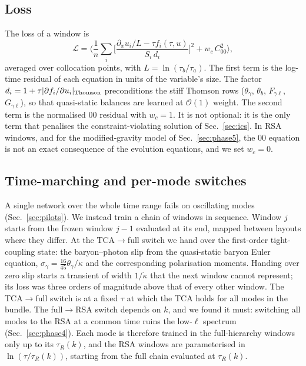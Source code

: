 \documentclass[prd,twocolumn,superscriptaddress,nofootinbib,floatfix]{revtex4-2}
\newcommand{\kd}{\dot\kappa}
\begin{document}
\subsection{Loss}
The loss of a window is
\begin{equation}
\mathcal{L}=\Big\langle \frac{1}{n}\sum_{i}\Big[\frac{\partial_x u_i/L-\tau f_i(\tau,u)}{S_i\,d_i}\Big]^2 + w_c\,C_{00}^2\Big\rangle ,\label{eq:loss}
\end{equation}
averaged over collocation points, with $L=\ln(\tau_b/\tau_a)$. The first term is the log-time residual of each equation in units of the variable's size. The factor $d_i=1+\tau|\partial f_i/\partial u_i|_{\rm Thomson}$ preconditions the stiff Thomson rows ($\theta_\gamma$, $\theta_b$, $F_{\gamma\ell}$, $G_{\gamma\ell}$), so that quasi-static balances are learned at $\mathcal{O}(1)$ weight. The second term is the normalised $00$ residual with $w_c=1$. It is not optional: it is the only term that penalises the constraint-violating solution of Sec.~\ref{sec:ics}. In RSA windows, and for the modified-gravity model of Sec.~\ref{sec:phase5}, the $00$ equation is not an exact consequence of the evolution equations, and we set $w_c=0$.

\subsection{Time-marching and per-mode switches}
A single network over the whole time range fails on oscillating modes (Sec.~\ref{sec:pilots}). We instead train a chain of windows in sequence. Window $j$ starts from the frozen window $j-1$ evaluated at its end, mapped between layouts where they differ. At the TCA$\to$full switch we hand over the first-order tight-coupling state: the baryon--photon slip from the quasi-static baryon Euler equation, $\sigma_\gamma=\frac{16}{45}\theta_\gamma/\kd$ and the corresponding polarisation moments. Handing over zero slip starts a transient of width $1/\kd$ that the next window cannot represent; its loss was three orders of magnitude above that of every other window. The TCA$\to$full switch is at a fixed $\tau$ at which the TCA holds for all modes in the bundle. The full$\to$RSA switch depends on $k$, and we found it must: switching all modes to the RSA at a common time ruins the low-$\ell$ spectrum (Sec.~\ref{sec:phase4}). Each mode is therefore trained in the full-hierarchy windows only up to its $\tau_R(k)$, and the RSA windows are parameterised in $\ln(\tau/\tau_R(k))$, starting from the full chain evaluated at $\tau_R(k)$.
\end{document}
